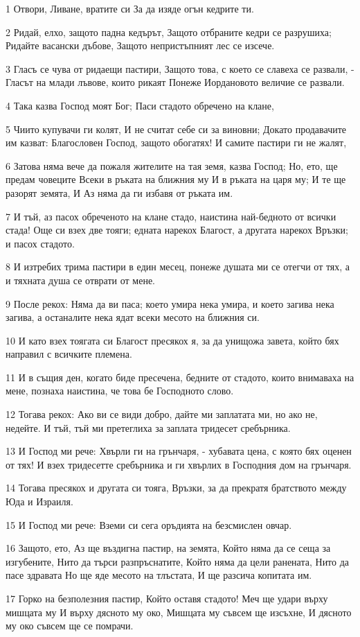\par 1 Отвори, Ливане, вратите си За да изяде огън кедрите ти.
\par 2 Ридай, елхо, защото падна кедърът, Защото отбраните кедри се разрушиха; Ридайте васански дъбове, Защото непристъпният лес се изсече.
\par 3 Гласъ се чува от ридаещи пастири, Защото това, с което се славеха се развали, - Гласът на млади лъвове, които рикаят Понеже Иордановото величие се развали.
\par 4 Така казва Господ моят Бог; Паси стадото обречено на клане,
\par 5 Чиито купувачи ги колят, И не считат себе си за виновни; Докато продавачите им казват: Благословен Господ, защото обогатях! И самите пастири ги не жалят,
\par 6 Затова няма вече да пожаля жителите на тая земя, казва Господ; Но, ето, ще предам човеците Всеки в ръката на ближния му И в ръката на царя му; И те ще разорят земята, И Аз няма да ги избавя от ръката им.
\par 7 И тъй, аз пасох обреченото на клане стадо, наистина най-бедното от всички стада! Още си взех две тояги; едната нарекох Благост, а другата нарекох Връзки; и пасох стадото.
\par 8 И изтребих трима пастири в един месец, понеже душата ми се отегчи от тях, а и тяхната душа се отврати от мене.
\par 9 После рекох: Няма да ви паса; което умира нека умира, и което загива нека загива, а останалите нека ядат всеки месото на ближния си.
\par 10 И като взех тоягата си Благост пресякох я, за да унищожа завета, който бях направил с всичките племена.
\par 11 И в същия ден, когато биде пресечена, бедните от стадото, които внимаваха на мене, познаха наистина, че това бе Господното слово.
\par 12 Тогава рекох: Ако ви се види добро, дайте ми заплатата ми, но ако не, недейте. И тъй, тъй ми претеглиха за заплата тридесет сребърника.
\par 13 И Господ ми рече: Хвърли ги на грънчаря, - хубавата цена, с която бях оценен от тях! И взех тридесетте сребърника и ги хвърлих в Господния дом на грънчаря.
\par 14 Тогава пресякох и другата си тояга, Връзки, за да прекратя братството между Юда и Израиля.
\par 15 И Господ ми рече: Вземи си сега оръдията на безсмислен овчар.
\par 16 Защото, ето, Аз ще въздигна пастир, на земята, Който няма да се сеща за изгубените, Нито да търси разпръснатите, Който няма да цели ранената, Нито да пасе здравата Но ще яде месото на тлъстата, И ще разсича копитата им.
\par 17 Горко на безполезния пастир, Който оставя стадото! Меч ще удари върху мишцата му И върху дясното му око, Мишцата му съвсем ще изсъхне, И дясното му око съвсем ще се помрачи.

